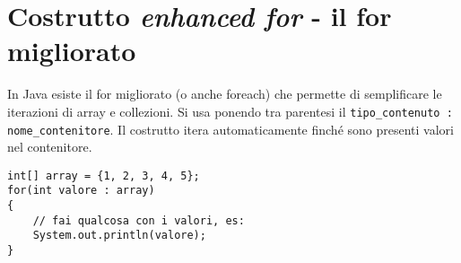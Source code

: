 \section{Costrutto \textit{enhanced for} - il for migliorato}
In Java esiste il for migliorato (o anche foreach) che permette di semplificare le iterazioni di array e collezioni. Si usa ponendo tra parentesi il \texttt{tipo\_contenuto : nome\_contenitore}. Il costrutto itera automaticamente finché sono presenti valori nel contenitore.

\begin{lstlisting}
int[] array = {1, 2, 3, 4, 5};
for(int valore : array)
{
	// fai qualcosa con i valori, es:
	System.out.println(valore);
}
\end{lstlisting}